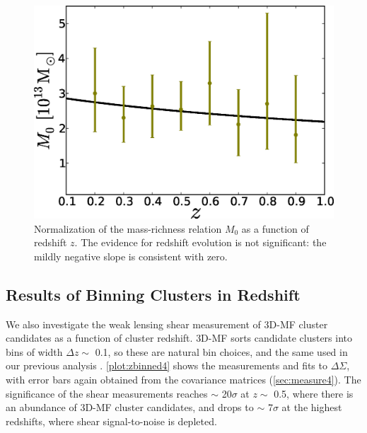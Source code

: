 \begin{figure}
\begin{center}
  \includegraphics[scale=0.7]{plots_ch4/Mo_vs_z_DuttonMaccio_powerlaw.eps}
  \caption[Redshift Dependence of Mass-Richness Normalization]{Normalization of the mass-richness relation $M_0$ as a function of redshift $z$. The evidence for redshift evolution is not significant: the mildly negative slope is consistent with zero.}
\label{plot:MoVSz4} %
\end{center}
\end{figure}

\subsection{Results of Binning Clusters in Redshift}
We also investigate the weak lensing shear measurement of \ac{3D-MF} cluster candidates as a function of cluster redshift. \ac{3D-MF} sorts candidate clusters into bins of width $\Delta z \sim$ 0.1, so these are natural bin choices, and the same used in our previous analysis \citep{Ford14}. \autoref{plot:zbinned4} shows the measurements and fits to $\Delta \Sigma$, with error bars again obtained from the covariance matrices (\autoref{sec:measure4}). The significance of the shear measurements reaches $\sim$ 20$\sigma$ at $z \sim$ 0.5, where there is an abundance of \ac{3D-MF} cluster candidates, and drops to $\sim$ 7$\sigma$ at the highest redshifts, where shear signal-to-noise is depleted. 

